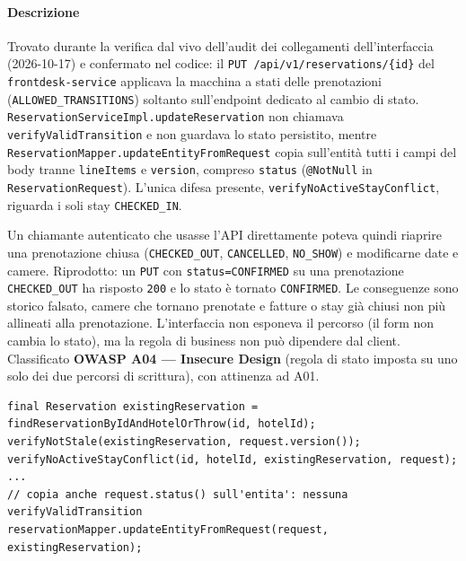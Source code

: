 ﻿\documentclass[a4paper,12pt]{report}
\begin{document}
\paragraph{Descrizione}
Trovato durante la verifica dal vivo dell'audit dei collegamenti dell'interfaccia
(2026-10-17) e confermato nel codice: il \texttt{PUT /api/v1/reservations/\{id\}} del
\texttt{frontdesk-service} applicava la macchina a stati delle prenotazioni
(\texttt{ALLOWED\_TRANSITIONS}) soltanto sull'endpoint dedicato al cambio di stato.
\texttt{ReservationServiceImpl.updateReservation} non chiamava \texttt{verifyValidTransition}
e non guardava lo stato persistito, mentre \texttt{ReservationMapper.updateEntityFromRequest}
copia sull'entità tutti i campi del body tranne \texttt{lineItems} e \texttt{version},
compreso \texttt{status} (\texttt{@NotNull} in \texttt{ReservationRequest}). L'unica difesa
presente, \texttt{verifyNoActiveStayConflict}, riguarda i soli stay \texttt{CHECKED\_IN}.

Un chiamante autenticato che usasse l'API direttamente poteva quindi riaprire una
prenotazione chiusa (\texttt{CHECKED\_OUT}, \texttt{CANCELLED}, \texttt{NO\_SHOW}) e
modificarne date e camere. Riprodotto: un \texttt{PUT} con \texttt{status=CONFIRMED} su una
prenotazione \texttt{CHECKED\_OUT} ha risposto \texttt{200} e lo stato è tornato
\texttt{CONFIRMED}. Le conseguenze sono storico falsato, camere che tornano prenotate e
fatture o stay già chiusi non più allineati alla prenotazione. L'interfaccia non esponeva il
percorso (il form non cambia lo stato), ma la regola di business non può dipendere dal client.
Classificato \textbf{OWASP A04 --- Insecure Design} (regola di stato imposta su uno solo dei due
percorsi di scrittura), con attinenza ad A01.

\begin{insecurebox}[title={ReservationServiceImpl.java --- updateReservation senza controllo di stato (baseline)}]
\begin{lstlisting}[style=java]
final Reservation existingReservation = findReservationByIdAndHotelOrThrow(id, hotelId);
verifyNotStale(existingReservation, request.version());
verifyNoActiveStayConflict(id, hotelId, existingReservation, request);
...
// copia anche request.status() sull'entita': nessuna verifyValidTransition
reservationMapper.updateEntityFromRequest(request, existingReservation);
\end{lstlisting}
\end{insecurebox}
\end{document}
